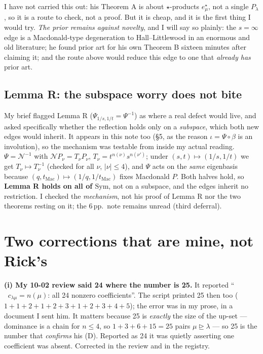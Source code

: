 \documentclass[11pt]{article}
\newcommand{\lam}{\lambda}
\newcommand{\dom}{\trianglerighteq}
\newcommand{\estar}{e^{\star}}
\DeclareMathOperator{\vals}{val_s}
\begin{document}
I have not carried this out: his Theorem A is about $\star$-products $\estar_\mu$, not a
single $P_\lam$, so it is a route to check, not a proof. But it is cheap, and it is the first
thing I would try. \emph{The prior remains against novelty}, and I will say so plainly: the
$s=\infty$ edge is a Macdonald-type degeneration to Hall--Littlewood in an enormous and old
literature; he found prior art for his own Theorem B sixteen minutes after claiming it; and
the route above would reduce this edge to one that \emph{already has} prior art.

\subsection*{Lemma R: the subspace worry does not bite}

My brief flagged Lemma R ($\Psi_{1/s,1/t}=\Psi^{-1}$) as where a real defect would live, and
asked specifically whether the reflection holds only on a \emph{subspace}, which both new
edges would inherit. It appears in this note too (\S5, as the reason $\iota=\Psi\circ\beta$ is
an involution), so the mechanism was testable from inside my actual reading. $\Psi=\mathcal
N^{-1}$ with $\mathcal NP_\nu=T_\nu P_\nu$, $T_\nu=t^{n(\nu)}s^{n(\nu')}$; under
$(s,t)\mapsto(1/s,1/t)$ we get $T_\nu\mapsto T_\nu^{-1}$ (checked for all $\nu$,
$|\nu|\le4$), and $\Psi$ acts on the \emph{same} eigenbasis because
$(q,t_{\mathrm{Mac}})\mapsto(1/q,1/t_{\mathrm{Mac}})$ fixes Macdonald $P$. Both halves hold,
so \textbf{Lemma R holds on all of $\mathrm{Sym}$}, not on a subspace, and the edges inherit
no restriction. I checked the \emph{mechanism}, not his proof of Lemma R nor the two theorems
resting on it; the 6\,pp.\ note remains unread (third deferral).

\section{Two corrections that are mine, not Rick's}

\textbf{(i) My 10-02 review said 24 where the number is 25.} It reported
``$\vals c_{\lam\mu}=n(\mu)$: all 24 nonzero coefficients''. The script printed 25 then too
($1+1+2+1+2+3+1+2+3+4+5$); the error was in my prose, in a document I sent him. It matters
because 25 is \emph{exactly} the size of the up-set --- dominance is a chain for $n\le4$, so
$1+3+6+15=25$ pairs $\mu\dom\lam$ --- so 25 is the number that \emph{confirms} his (D).
Reported as 24 it was quietly asserting one coefficient was absent. Corrected in the review
and in the registry.
\end{document}
